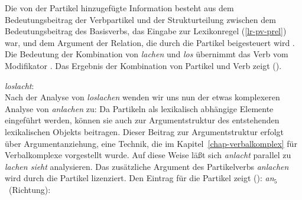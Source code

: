 \noindent
Die von der Partikel hinzugefügte Information besteht aus dem Bedeutungsbeitrag der Verbpartikel
und der Strukturteilung zwischen dem Bedeutungsbeitrag
des Basisverbs, das Eingabe zur Lexikonregel (\ref{lr-pv-prel}) war, und dem Argument der Relation,
die durch die Partikel beigesteuert wird . 
Die Bedeutung der Kombination von \emph{lachen} und \emph{los} übernimmt das Verb vom Modifikator
. 
Das Ergebnis der Kombination von Partikel und Verb zeigt ().

\eas
\label{le-loslacht}
\emph{loslacht}:\\
\zs
Nach der Analyse von \emph{loslachen} wenden wir uns nun der etwas komplexeren Analyse von
\emph{anlachen} zu: Da Partikeln als lexikalisch abhängige Elemente eingeführt werden, 
können sie auch zur Argumentstruktur des entstehenden lexikalischen Objekts
beitragen. Dieser Beitrag zur Argumentstruktur erfolgt über Argumentanziehung,
eine Technik, die im Kapitel~\ref{chap-verbalkomplex} für Verbalkomplexe vorgestellt
wurde. Auf diese Weise läßt sich \emph{anlacht} parallel zu \emph{lachen sieht}
analysieren. Das zusätzliche Argument des Partikelverbs \emph{anlachen} wird durch
die Partikel lizenziert. Den Eintrag für die Partikel zeigt ():
\eas
\label{le-an5}
\mbox{{\em an$_5$\/} (Richtung):}\\
\zs

